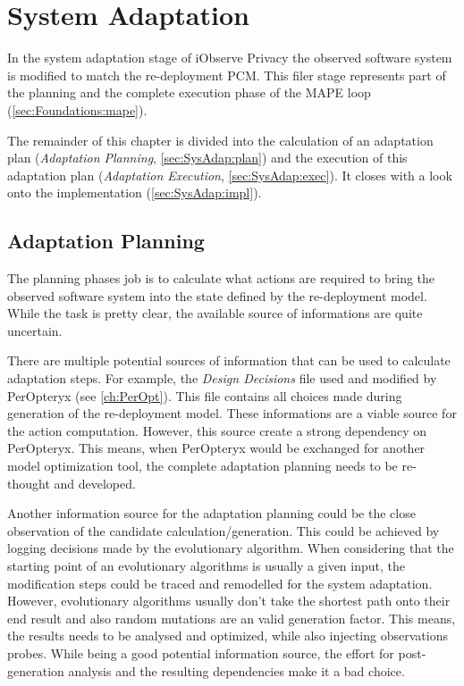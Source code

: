 \chapter{System Adaptation}
\label{ch:SysAdap}

In the system adaptation stage of iObserve Privacy the observed software system is modified to match the re-deployment PCM. This filer stage represents part of the planning and the complete execution phase of the MAPE loop (\autoref{sec:Foundations:mape}).

The remainder of this chapter is divided into the calculation of an adaptation plan (\textit{Adaptation Planning}, \autoref{sec:SysAdap:plan}) and the execution of this adaptation plan (\textit{Adaptation Execution}, \autoref{sec:SysAdap:exec}). It closes with a look onto the implementation (\autoref{sec:SysAdap:impl}).


\section{Adaptation Planning}
\label{sec:SysAdap:plan}

The planning phases job is to calculate what actions are required to bring the observed software system into the state defined by the re-deployment model. While the task is pretty clear, the available source of informations are quite uncertain.

There are multiple potential sources of information that can be used to calculate adaptation steps. For example, the \textit{Design Decisions} file used and modified by PerOpteryx (see \autoref{ch:PerOpt}). This file contains all choices made during generation of the re-deployment model. These informations are a viable source for the action computation. However, this source create a strong dependency on PerOpteryx. This means, when PerOpteryx would be exchanged for another model optimization tool, the complete adaptation planning needs to be re-thought and developed.

Another information source for the adaptation planning could be the close observation of the candidate calculation/generation. This could be achieved by logging decisions made by the evolutionary algorithm. When considering that the starting point of an evolutionary algorithms is usually a given input, the modification steps could be traced and remodelled for the system adaptation. However, evolutionary algorithms usually don't take the shortest path onto their end result and also random mutations are an valid generation factor. This means, the results needs to be analysed and optimized, while also injecting observations probes. While being a good potential information source, the effort for post-generation analysis and the resulting dependencies make it a bad choice.

